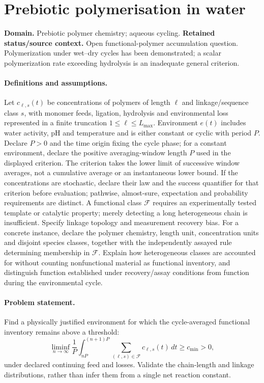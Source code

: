\documentclass[11pt]{article}
\begin{document}
\section*{Prebiotic polymerisation in water}
\label{prob:283}
\label{rank:189}
\par\smallskip

\noindent\textbf{Domain.} Prebiotic polymer chemistry; aqueous cycling. \quad \textbf{Retained status/source context.} Open functional-polymer accumulation question. Polymerization under wet--dry cycles has been demonstrated; a scalar polymerization rate exceeding hydrolysis is an inadequate general criterion.

\paragraph{Definitions and assumptions.} Let $c_{\ell,s}(t)$ be concentrations of polymers of length $\ell$ and linkage/sequence class $s$, with monomer feeds, ligation, hydrolysis and environmental loss represented in a finite truncation $1\leq\ell\leq L_{\max}$. Environment $e(t)$ includes water activity, pH and temperature and is either constant or cyclic with period $P$. Declare $P>0$ and the time origin fixing the cycle phase; for a constant environment, declare the positive averaging-window length $P$ used in the displayed criterion. The criterion takes the lower limit of successive window averages, not a cumulative average or an instantaneous lower bound. If the concentrations are stochastic, declare their law and the success quantifier for that criterion before evaluation; pathwise, almost-sure, expectation and probability requirements are distinct. A functional class $\mathcal F$ requires an experimentally tested template or catalytic property; merely detecting a long heterogeneous chain is insufficient. Specify linkage topology and measurement recovery bias. For a concrete instance, declare the polymer chemistry, length unit, concentration units and disjoint species classes, together with the independently assayed rule determining membership in $\mathcal F$. Explain how heterogeneous classes are accounted for without counting nonfunctional material as functional inventory, and distinguish function established under recovery/assay conditions from function during the environmental cycle.

\paragraph{Problem statement.} Find a physically justified environment for which the cycle-averaged functional inventory remains above a threshold:
\[
\liminf_{n\to\infty}\frac1P\int_{nP}^{(n+1)P}
\sum_{(\ell,s)\in\mathcal F}c_{\ell,s}(t)\,dt\geq c_{\min}>0,
\]
under declared continuing feed and losses. Validate the chain-length and linkage distributions, rather than infer them from a single net reaction constant.
\end{document}
